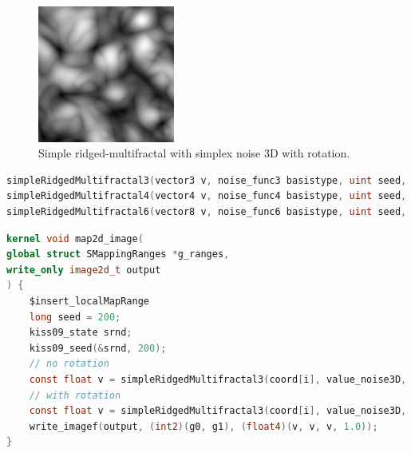 \begin{figure}[h]
\centering
\includegraphics[width=0.4\textwidth]{out/simpleRidgedMultifractal3/simpleRidgedMultifractal3_simplex_noise3D_noInterp_rot.png}
\caption{Simple ridged-multifractal with simplex noise 3D with rotation.}
\label{fig:simple_redgedmf3_simplex_noise3D_noInterp_rot}
\end{figure}

\begin{lstlisting}[caption={Definition of simple ridged multi-fractal functions},label={lst:simple_redgedmf3_definition},language=OpenCL]
simpleRidgedMultifractal3(vector3 v, noise_func3 basistype, uint seed, interp_func interp, random_func rnd, void *srnd, uint numoctaves, REAL frequency, bool rot);
simpleRidgedMultifractal4(vector4 v, noise_func4 basistype, uint seed, interp_func interp, random_func rnd, void *srnd, uint numoctaves, REAL frequency, bool rot);
simpleRidgedMultifractal6(vector8 v, noise_func6 basistype, uint seed, interp_func interp, random_func rnd, void *srnd, uint numoctaves, REAL frequency, bool rot);
\end{lstlisting}

\begin{lstlisting}[caption={Example for simple ridged multi-fractal functions},label={lst:simple_redgedmf3_example},language=OpenCL]
kernel void map2d_image(
global struct SMappingRanges *g_ranges,
write_only image2d_t output
) {
    $insert_localMapRange
    long seed = 200;
    kiss09_state srnd;
    kiss09_seed(&srnd, 200);
    // no rotation
    const float v = simpleRidgedMultifractal3(coord[i], value_noise3D, 200, noInterp, random_kiss09, &srnd, 3, 0.125, false);
    // with rotation
    const float v = simpleRidgedMultifractal3(coord[i], value_noise3D, 200, noInterp, random_kiss09, &srnd, 3, 0.125, true);
    write_imagef(output, (int2)(g0, g1), (float4)(v, v, v, 1.0));
}
\end{lstlisting}

